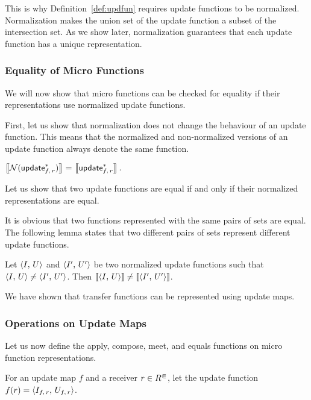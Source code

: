 This is why Definition~\ref{def:updfun} requires update functions to be normalized. Normalization makes the union set of the update function a subset of the intersection set.
As we show later, normalization guarantees that each update function has a unique representation.

\subsubsection{Equality of Micro Functions}\label{sec:equality}
We will now show that micro functions can be checked for equality if their representations use normalized update functions.

First, let us show that normalization does not change the behaviour of an update function. This means that the normalized and non-normalized versions of an update function always denote the same function.
   
\begin{lemma}\label{lem:normeq}
    $\left\llbracket\mathcal N(\textsf{update}_{f,\,r}^*)\right\rrbracket=\left\llbracket\textsf{update}_{f,\,r}^*\right\rrbracket.$
\end{lemma}


Let us show that two update functions are equal if and only if their normalized representations are equal.

It is obvious that two functions represented with the same pairs of sets are equal. The following lemma states that two different pairs of sets represent different update functions.

\begin{lemma}\label{lem:normuneq}
    Let $\left\langle I,\,U\right\rangle$ and $\left\langle I',\,U'\right\rangle$ be two normalized update functions such that $\left\langle I,\,U\right\rangle\ne\left\langle I',\,U'\right\rangle$. Then $\left\llbracket\left\langle I,\,U\right\rangle\right\rrbracket\ne\left\llbracket\left\langle I',\,U'\right\rangle\right\rrbracket$.
\end{lemma}

We have shown that transfer functions can be represented using update maps. 

\subsubsection{Operations on Update Maps}\label{sec:opsTransRep}

Let us now define the apply, compose, meet, and equals functions on micro function representations.

For an update map $f$ and  a receiver $r\in {R^\Subset}$, let the update function $f(r)=\left\langle I_{f,\,r},\,U_{f,\,r}\right\rangle$.

